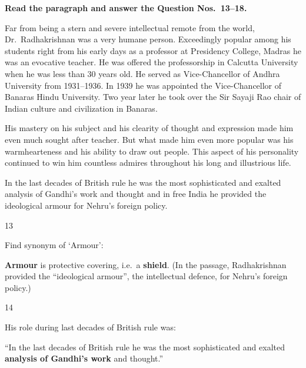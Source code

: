 \begin{context}
\textbf{Read the paragraph and answer the Question Nos.~13--18.}\par\smallskip
Far from being a stern and severe intellectual remote from the world, Dr.~Radhakrishnan was a very humane person. Exceedingly popular among his students right from his early days as a professor at Presidency College, Madras he was an evocative teacher. He was offered the professorship in Calcutta University when he was less than 30 years old. He served as Vice-Chancellor of Andhra University from 1931--1936. In 1939 he was appointed the Vice-Chancellor of Banaras Hindu University. Two year later he took over the Sir Sayaji Rao chair of Indian culture and civilization in Banaras.

His mastery on his subject and his clearity of thought and expression made him even much sought after teacher. But what made him even more popular was his warmhearteness and his ability to draw out people. This aspect of his personality continued to win him countless admires throughout his long and illustrious life.

In the last decades of British rule he was the most sophisticated and exalted analysis of Gandhi's work and thought and in free India he provided the ideological armour for Nehru's foreign policy.
\end{context}
\begin{question}{13}
{Find synonym of `Armour':\par}
\begin{explain}
\textbf{Armour} is protective covering, i.e.\ a \textbf{shield}. (In the passage, Radhakrishnan provided the ``ideological armour'', the intellectual defence, for Nehru's foreign policy.)
\end{explain}
\end{question}

\begin{question}{14}
{His role during last decades of British rule was:\par}
\begin{explain}
``In the last decades of British rule he was the most sophisticated and exalted \textbf{analysis of Gandhi's work} and thought.''
\end{explain}
\end{question}

